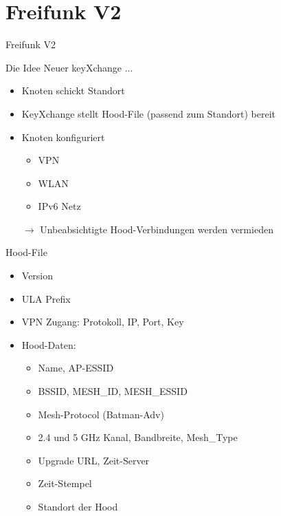 \section{Freifunk V2}

\begin{frame}{}
    \begin{center}
        Freifunk V2
     \end{center}
\end{frame}

\begin{frame}{Die Idee}
    Neuer keyXchange ...

    \begin{itemize}
        \item Knoten schickt Standort
        \item KeyXchange stellt Hood-File (passend zum Standort) bereit
        \item Knoten konfiguriert
        \begin{itemize}
            \item VPN
            \item WLAN
            \item IPv6 Netz
        \end{itemize}
        \item[$\rightarrow$] Unbeabsichtigte Hood-Verbindungen werden vermieden
    \end{itemize}
\end{frame}

\begin{frame}{Hood-File}
    \begin{itemize}
        \item Version
        \item ULA Prefix
        \item VPN Zugang: Protokoll, IP, Port, Key
        \item Hood-Daten: 
        \begin{itemize}
            \item Name, AP-ESSID
            \item BSSID, MESH\_ID, MESH\_ESSID
            \item Mesh-Protocol (Batman-Adv)
            \item 2.4 und 5 GHz Kanal, Bandbreite, Mesh\_Type
            \item Upgrade URL, Zeit-Server
            \item Zeit-Stempel
            \item Standort der Hood
        \end{itemize}
    \end{itemize}
\end{frame}

